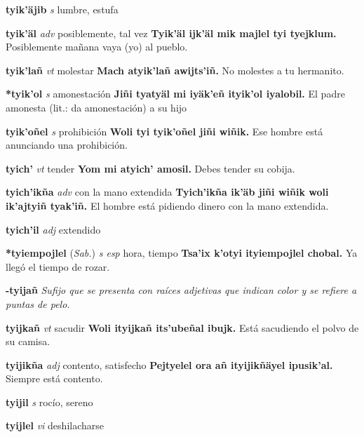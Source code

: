 \documentclass[10pt]{scrbook}
\newcommand{\entry}[1]{\textbf{#1}}
\newcommand{\nontranslationdef}[1]{\textit{#1}}
\newcommand{\partofspeech}[1]{\textit{#1}}
\newcommand{\spanishtranslation}[1]{#1}
\newcommand{\cholexample}[1]{\textbf{#1}}
\newcommand{\exampletranslation}[1]{#1}
\newcommand{\relevantdialect}[1]{(\textit{#1})}
\begin{document}
\begin{multicols}{2}
\entry{tyik'äjib}
\partofspeech{s}
\spanishtranslation{lumbre, estufa}

\entry{tyik'äl}
\partofspeech{adv}
\spanishtranslation{posiblemente, tal vez}
\cholexample{Tyik'äl ijk'äl mik majlel tyi tyejklum.}
\exampletranslation{Posiblemente mañana vaya (yo) al pueblo.}

\entry{tyik'lañ}
\partofspeech{vt}
\spanishtranslation{molestar}
\cholexample{Mach atyik'lañ awijts'iñ.}
\exampletranslation{No molestes a tu hermanito.}

\entry{*tyik'ol}
\partofspeech{s}
\spanishtranslation{amonestación}
\cholexample{Jiñi tyatyäl mi iyäk'eñ ityik'ol iyalobil.}
\exampletranslation{El padre amonesta (lit.: da amonestación) a su hijo}

\entry{tyik'oñel}
\partofspeech{s}
\spanishtranslation{prohibición}
\cholexample{Woli tyi tyik'oñel jiñi wiñik.}
\exampletranslation{Ese hombre está anunciando una prohibición.}

\entry{tyich'}
\partofspeech{vt}
\spanishtranslation{tender}
\cholexample{Yom mi atyich' amosil.}
\exampletranslation{Debes tender su cobija.}

\entry{tyich'ikña}
\partofspeech{adv}
\spanishtranslation{con la mano extendida}
\cholexample{Tyich'ikña ik'äb jiñi wiñik woli ik'ajtyiñ tyak'iñ.}
\exampletranslation{El hombre está pidiendo dinero con la mano extendida.}

\entry{tyich'il}
\partofspeech{adj}
\spanishtranslation{extendido}

\entry{*tyiempojlel}
\relevantdialect{Sab.}
\partofspeech{s esp}
\spanishtranslation{hora, tiempo}
\cholexample{Tsa'ix k'otyi ityiempojlel chobal.}
\exampletranslation{Ya llegó el tiempo de rozar.}

\entry{-tyijañ}
\nontranslationdef{Sufijo que se presenta con raíces adjetivas que indican color y se refiere a puntas de pelo.}

\entry{tyijkañ}
\partofspeech{vt}
\spanishtranslation{sacudir}
\cholexample{Woli ityijkañ its'ubeñal ibujk.}
\exampletranslation{Está sacudiendo el polvo de su camisa.}

\entry{tyijikña}
\partofspeech{adj}
\spanishtranslation{contento, satisfecho}
\cholexample{Pejtyelel ora añ ityijikñäyel ipusik'al.}
\exampletranslation{Siempre está contento.}

\entry{tyijil}
\partofspeech{s}
\spanishtranslation{rocío, sereno}

\entry{tyijlel}
\partofspeech{vi}
\spanishtranslation{deshilacharse}


\end{multicols}
\end{document}
